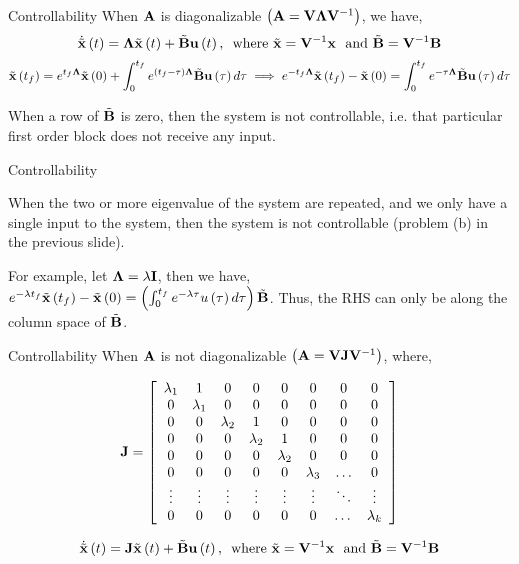 \documentclass[aspectratio=169]{beamer}
\def\mf{\ensuremath\mathbf}
\def\lp{\ensuremath\left(}
\def\rp{\ensuremath\right)}
\newcommand{\ct}[1]{\lp #1\rp}
\begin{document}
\begin{frame}[t]{Controllability}
When $\mf{A}$ is diagonalizable $\ct{\mf{A} = \mf{V}\mf{\Lambda}\mf{V}^{-1}}$, we have,
\[ \dot{\tilde{\mf{x}}}\ct{t} = \mf{\Lambda}\tilde{\mf{x}}\ct{t} + \tilde{\mf{B}}\mf{u}\ct{t}, \,\,\,\text{where } \tilde{\mf{x}} = \mf{V}^{-1}\mf{x} \,\, \text{ and } \tilde{\mf{B}} = \mf{V}^{-1}\mf{B}\]
\[ \tilde{\mf{x}}\ct{t_f} = e^{t_f\mf{\Lambda}}\tilde{\mf{x}}\ct{0} + \int_{0}^{t_f} e^{\ct{t_f - \tau}\mf{\Lambda}}\tilde{\mf{B}}\mf{u}\ct{\tau}d\tau \implies e^{-t_f\mf{\Lambda}}\tilde{\mf{x}}\ct{t_f} - \tilde{\mf{x}}\ct{0} =  \int_{0}^{t_f} e^{-\tau\mf{\Lambda}}\tilde{\mf{B}}\mf{u}\ct{\tau}d\tau \]

When a row of $\tilde{\mf{B}}$ is zero, then the system is not controllable, i.e. that particular first order block does not receive any input.\vspace{0.2cm}
\end{frame}


\begin{frame}[t]{Controllability}

When the two or more eigenvalue of the system are repeated, and we only have a single input to the system, then the system is not controllable (problem (b) in the previous slide).

For example, let $\mf{\Lambda} = \lambda \mf{I}$, then we have, $e^{-\lambda t_f}\tilde{\mf{x}}\ct{t_f} - \tilde{\mf{x}}\ct{0} =  \ct{\int_{0}^{t_f} e^{-\lambda\tau}u\ct{\tau}d\tau}\tilde{\mf{B}}$. Thus, the RHS can only be along the column space of $\tilde{\mf{B}}$.

\end{frame}


\begin{frame}[t]{Controllability}
When $\mf{A}$ is not diagonalizable $\ct{\mf{A} = \mf{V}\mf{J}\mf{V}^{-1}}$, where,

\[ \mf{J} = \left[
\begin{array}{cccccccc}
\lambda_1 & 1 & 0 & 0 & 0 & 0 & 0 & 0 \\
0 & \lambda_1 & 0 & 0 & 0 & 0 & 0 & 0 \\
0 & 0 & \lambda_2 & 1 & 0 & 0 & 0 & 0 \\
0 & 0 & 0 & \lambda_2 & 1 & 0 & 0 & 0 \\
0 & 0 & 0 & 0 & \lambda_2 & 0 & 0 & 0 \\
0 & 0 & 0 & 0 & 0 & \lambda_3 & \ldots & 0 \\
\vdots & \vdots & \vdots & \vdots & \vdots & \vdots & \ddots & \vdots \\
0 & 0 & 0 & 0 & 0 & 0 & \dots & \lambda_k
\end{array}
\right]
\]

\[ \dot{\tilde{\mf{x}}}\ct{t} = \mf{J}\tilde{\mf{x}}\ct{t} + \tilde{\mf{B}}\mf{u}\ct{t}, \,\,\,\text{where } \tilde{\mf{x}} = \mf{V}^{-1}\mf{x} \,\, \text{ and } \tilde{\mf{B}} = \mf{V}^{-1}\mf{B} \]

\end{frame}
\end{document}
